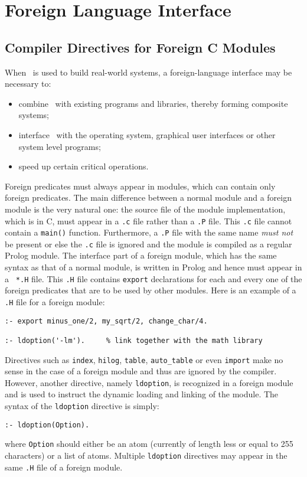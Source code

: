 \chapter{Foreign Language Interface}
\label{foreign}

\section{Compiler Directives for Foreign C Modules}

When \ourprolog\ is used to build real-world systems, a foreign-language
interface may be necessary to:
\begin{itemize}
\item combine \ourprolog\ with existing programs and libraries, thereby
      forming composite systems;
\item interface \ourprolog\ with the operating system, graphical user 
      interfaces or other system level programs;
\item speed up certain critical operations.
\end{itemize}


Foreign predicates must always appear in modules, which can contain
only foreign predicates.  The main difference between a normal module
and a foreign module is the very natural one: the source file of the
module implementation, which is in C, must appear in a {\tt *.c} file
rather than a {\tt *.P} file.  This {\tt *.c} file cannot contain a
{\tt main()} function.  Furthermore, a {\tt *.P} file with the same
name {\em must not} be present or else the {\tt *.c} file is ignored
and the module is compiled as a regular Prolog module.  The interface
part of a foreign module, which has the same syntax as that of a
normal module, is written in Prolog and hence must appear in a {\tt
*.H} file.  This {\tt *.H} file contains {\tt export} declarations
for each and every one of the foreign predicates that are to be used
by other modules.  Here is an example of a {\tt .H} file for a foreign
module:

\begin{verbatim}
:- export minus_one/2, my_sqrt/2, change_char/4.

:- ldoption('-lm').     % link together with the math library
\end{verbatim}

Directives such as {\tt index}, {\tt hilog}, {\tt table}, {\tt auto\_table} 
or even {\tt import} make no sense in the case of a foreign module and thus 
are ignored by the compiler.  However, another directive, namely 
{\tt ldoption}, is recognized in a foreign module and is used to instruct 
the dynamic loading and linking of the module.  
The syntax of the {\tt ldoption} directive is simply:
\begin{center}
{\tt  :- ldoption(Option).    }
\end{center}
where {\tt Option} should either be an atom (currently of length less
or equal to 255 characters) or a list of atoms.  Multiple {\tt ldoption}
directives may appear in the same {\tt .H} file of a foreign module.


